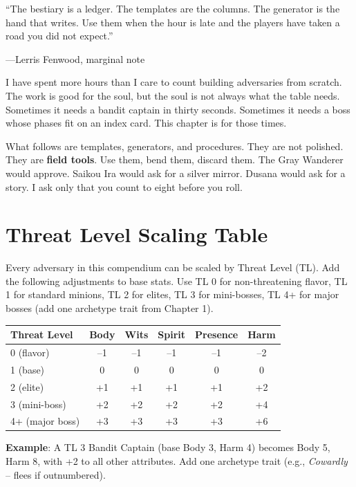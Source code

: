 
\epigraph{``The bestiary is a ledger. The templates are the columns. The generator is the hand that writes. Use them when the hour is late and the players have taken a road you did not expect.''}{---Lerris Fenwood, marginal note}

I have spent more hours than I care to count building adversaries from scratch. The work is good for the soul, but the soul is not always what the table needs. Sometimes it needs a bandit captain in thirty seconds. Sometimes it needs a boss whose phases fit on an index card. This chapter is for those times.

What follows are templates, generators, and procedures. They are not polished. They are \textbf{field tools}. Use them, bend them, discard them. The Gray Wanderer would approve. Saikou Ira would ask for a silver mirror. Dusana would ask for a story. I ask only that you count to eight before you roll.

\section*{Threat Level Scaling Table}

\noindent Every adversary in this compendium can be scaled by Threat Level (TL). Add the following adjustments to base stats. Use TL 0 for non-threatening flavor, TL 1 for standard minions, TL 2 for elites, TL 3 for mini-bosses, TL 4+ for major bosses (add one archetype trait from Chapter 1).

\begin{tabular}{|l|c|c|c|c|c|}
\hline
\textbf{Threat Level} & \textbf{Body} & \textbf{Wits} & \textbf{Spirit} & \textbf{Presence} & \textbf{Harm} \\
\hline
0 (flavor) & --1 & --1 & --1 & --1 & --2 \\
1 (base) & 0 & 0 & 0 & 0 & 0 \\
2 (elite) & +1 & +1 & +1 & +1 & +2 \\
3 (mini-boss) & +2 & +2 & +2 & +2 & +4 \\
4+ (major boss) & +3 & +3 & +3 & +3 & +6 \\
\hline
\end{tabular}

\noindent\textbf{Example}: A TL 3 Bandit Captain (base Body 3, Harm 4) becomes Body 5, Harm 8, with +2 to all other attributes. Add one archetype trait (e.g., \emph{Cowardly} -- flees if outnumbered).

